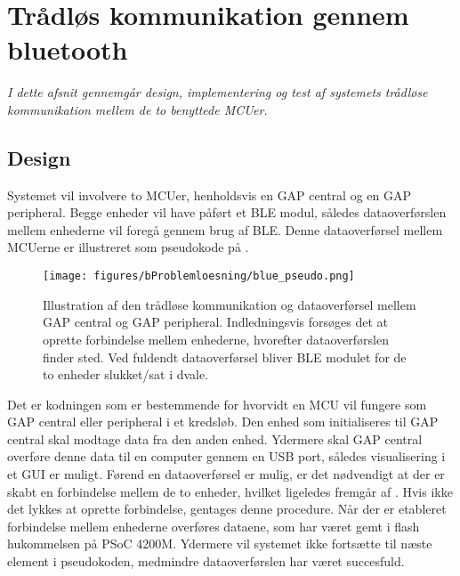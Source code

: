 \section{Trådløs kommunikation gennem bluetooth}
\textit{I dette afsnit gennemgår design, implementering og test af systemets trådløse kommunikation mellem de to benyttede MCUer.}

\subsection{Design}
Systemet vil involvere to MCUer, henholdsvis en GAP central og en GAP peripheral. Begge enheder vil have påført et BLE modul, således dataoverførslen mellem enhederne vil foregå gennem brug af BLE. Denne dataoverførsel mellem MCUerne er illustreret som pseudokode på . 

\begin{figure}[H]
	\centering
	\texttt{[image: figures/bProblemloesning/blue\_pseudo.png]}
	\caption{Illustration af den trådløse kommunikation og dataoverførsel mellem GAP central og GAP peripheral. Indledningsvis forsøges det at oprette forbindelse mellem enhederne, hvorefter dataoverførslen finder sted. Ved fuldendt dataoverførsel bliver BLE modulet for de to enheder slukket/sat i dvale.}
	\label{fig:blue_pseudo}
\end{figure}

Det er kodningen som er bestemmende for hvorvidt en MCU vil fungere som GAP central eller peripheral i et kredsløb. Den enhed som initialiseres til GAP central skal modtage data fra den anden enhed. Ydermere skal GAP central overføre denne data til en computer gennem en USB port, således visualisering i et GUI er muligt. \newline
Førend en dataoverførsel er mulig, er det nødvendigt at der er skabt en forbindelse mellem de to enheder, hvilket ligeledes fremgår af . Hvis ikke det lykkes at oprette forbindelse, gentages denne procedure. Når der er etableret forbindelse mellem enhederne overføres dataene, som har været gemt i flash hukommelsen på PSoC 4200M. Ydermere vil systemet ikke fortsætte til næste element i pseudokoden, medmindre dataoverførslen har været succesfuld.  

